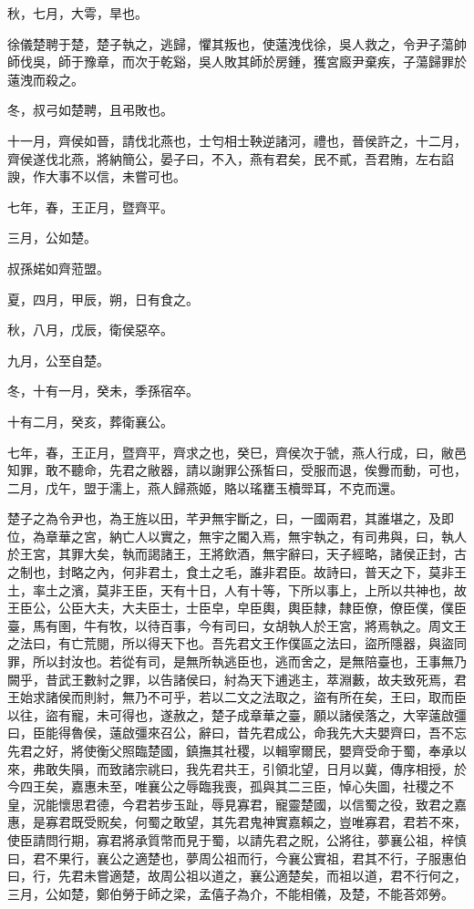 \begin{pinyinscope}
秋，七月，大雩，旱也。

徐儀楚聘于楚，楚子執之，逃歸，懼其叛也，使薳洩伐徐，吳人救之，令尹子蕩帥師伐吳，師于豫章，而次于乾谿，吳人敗其師於房鍾，獲宮廄尹棄疾，子蕩歸罪於薳洩而殺之。

冬，叔弓如楚聘，且弔敗也。

十一月，齊侯如晉，請伐北燕也，士匄相士鞅逆諸河，禮也，晉侯許之，十二月，齊侯遂伐北燕，將納簡公，晏子曰，不入，燕有君矣，民不貳，吾君賄，左右諂諛，作大事不以信，未嘗可也。

七年，春，王正月，暨齊平。

三月，公如楚。

叔孫婼如齊蒞盟。

夏，四月，甲辰，朔，日有食之。

秋，八月，戊辰，衛侯惡卒。

九月，公至自楚。

冬，十有一月，癸未，季孫宿卒。

十有二月，癸亥，葬衛襄公。

七年，春，王正月，暨齊平，齊求之也，癸巳，齊侯次于虢，燕人行成，曰，敝邑知罪，敢不聽命，先君之敝器，請以謝罪公孫皙曰，受服而退，俟釁而動，可也，二月，戊午，盟于濡上，燕人歸燕姬，賂以瑤罋玉櫝斝耳，不克而還。

楚子之為令尹也，為王旌以田，芊尹無宇斷之，曰，一國兩君，其誰堪之，及即位，為章華之宮，納亡人以實之，無宇之閽入焉，無宇執之，有司弗與，曰，執人於王宮，其罪大矣，執而謁諸王，王將飲酒，無宇辭曰，天子經略，諸侯正封，古之制也，封略之內，何非君土，食土之毛，誰非君臣。故詩曰，普天之下，莫非王土，率土之濱，莫非王臣，天有十日，人有十等，下所以事上，上所以共神也，故王臣公，公臣大夫，大夫臣士，士臣皁，皁臣輿，輿臣隸，隸臣僚，僚臣僕，僕臣臺，馬有圉，牛有牧，以待百事，今有司曰，女胡執人於王宮，將焉執之。周文王之法曰，有亡荒閱，所以得天下也。吾先君文王作僕區之法曰，盜所隱器，與盜同罪，所以封汝也。若從有司，是無所執逃臣也，逃而舍之，是無陪臺也，王事無乃闕乎，昔武王數紂之罪，以告諸侯曰，紂為天下逋逃主，萃淵藪，故夫致死焉，君王始求諸侯而則紂，無乃不可乎，若以二文之法取之，盜有所在矣，王曰，取而臣以往，盜有寵，未可得也，遂赦之，楚子成章華之臺，願以諸侯落之，大宰薳啟彊曰，臣能得魯侯，薳啟彊來召公，辭曰，昔先君成公，命我先大夫嬰齊曰，吾不忘先君之好，將使衡父照臨楚國，鎮撫其社稷，以輯寧爾民，嬰齊受命于蜀，奉承以來，弗敢失隕，而致諸宗祧曰，我先君共王，引領北望，日月以冀，傳序相授，於今四王矣，嘉惠未至，唯襄公之辱臨我喪，孤與其二三臣，悼心失圖，社稷之不皇，況能懷思君德，今君若步玉趾，辱見寡君，寵靈楚國，以信蜀之役，致君之嘉惠，是寡君既受貺矣，何蜀之敢望，其先君鬼神實嘉賴之，豈唯寡君，君若不來，使臣請問行期，寡君將承質幣而見于蜀，以請先君之貺，公將往，夢襄公祖，梓慎曰，君不果行，襄公之適楚也，夢周公祖而行，今襄公實祖，君其不行，子服惠伯曰，行，先君未嘗適楚，故周公祖以道之，襄公適楚矣，而祖以道，君不行何之，三月，公如楚，鄭伯勞于師之梁，孟僖子為介，不能相儀，及楚，不能荅郊勞。


\end{pinyinscope}
